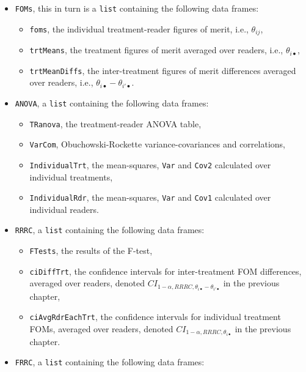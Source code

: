\documentclass[
]{book}
\providecommand{\tightlist}{%
  \setlength{\itemsep}{0pt}\setlength{\parskip}{0pt}}
\begin{document}
\begin{itemize}
\tightlist
\item
  \texttt{FOMs}, this in turn is a \texttt{list} containing the following data frames:

  \begin{itemize}
  \tightlist
  \item
    \texttt{foms}, the individual treatment-reader figures of merit, i.e., \(\theta_{i j}\),
  \item
    \texttt{trtMeans}, the treatment figures of merit averaged over readers, i.e., \(\theta_{i \bullet}\),
  \item
    \texttt{trtMeanDiffs}, the inter-treatment figures of merit differences averaged over readers, i.e., \(\theta_{i \bullet}-\theta_{i' \bullet}\).
  \end{itemize}
\item
  \texttt{ANOVA}, a \texttt{list} containing the following data frames:

  \begin{itemize}
  \tightlist
  \item
    \texttt{TRanova}, the treatment-reader ANOVA table,
  \item
    \texttt{VarCom}, Obuchowski-Rockette variance-covariances and correlations,
  \item
    \texttt{IndividualTrt}, the mean-squares, \texttt{Var} and \texttt{Cov2} calculated over individual treatments,
  \item
    \texttt{IndividualRdr}, the mean-squares, \texttt{Var} and \texttt{Cov1} calculated over individual readers.
  \end{itemize}
\item
  \texttt{RRRC}, a \texttt{list} containing the following data frames:

  \begin{itemize}
  \tightlist
  \item
    \texttt{FTests}, the results of the F-test,
  \item
    \texttt{ciDiffTrt}, the confidence intervals for inter-treatment FOM differences, averaged over readers, denoted \(CI_{1-\alpha,RRRC,\theta_{i \bullet} - \theta_{i' \bullet}}\) in the previous chapter,
  \item
    \texttt{ciAvgRdrEachTrt}, the confidence intervals for individual treatment FOMs, averaged over readers, denoted \(CI_{1-\alpha,RRRC,\theta_{i \bullet}}\) in the previous chapter.
  \end{itemize}
\item
  \texttt{FRRC}, a \texttt{list} containing the following data frames:


\end{itemize}
\end{document}
